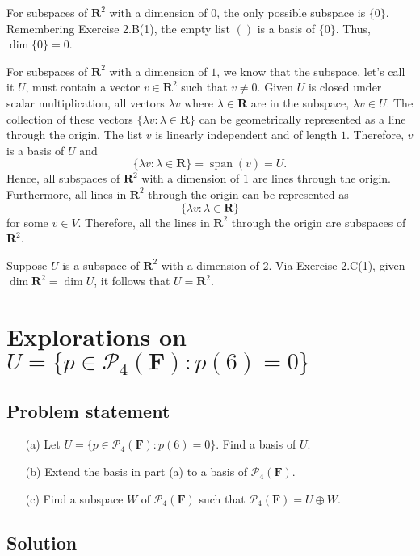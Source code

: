 \documentclass{article}
\begin{document}
For subspaces of $\mathbf{R}^2$ with a dimension of $0$, the only possible subspace is $\{0\}$. 
Remembering Exercise 2.B(1), the empty list $()$ is a basis of $\{0\}$. 
Thus, $\operatorname{dim}\{0\}=0$.

For subspaces of $\mathbf{R}^2$ with a dimension of $1$, we know that the subspace, let's call it $U$, must contain a vector $v\in\mathbf{R}^2$ such that $v\neq0$. 
Given $U$ is closed under scalar multiplication, all vectors $\lambda v$ where $\lambda\in\mathbf{R}$ are in the subspace, $\lambda v\in U$. 
The collection of these vectors $\{\lambda v:\lambda\in\mathbf{R}\}$ can be geometrically represented as a line through the origin. 
The list $v$ is linearly independent and of length $1$. 
Therefore, $v$ is a basis of $U$ and
\[\{\lambda v:\lambda\in\mathbf{R}\}=\operatorname{span}(v)=U.\]
Hence, all subspaces of $\mathbf{R}^2$ with a dimension of $1$ are lines through the origin. 
Furthermore, all lines in $\mathbf{R}^2$ through the origin can be represented as 
\[\{\lambda v:\lambda\in\mathbf{R}\}\]
for some $v\in V$. 
Therefore, all the lines in $\mathbf{R}^2$ through the origin are subspaces of $\mathbf{R}^2$.

Suppose $U$ is a subspace of $\mathbf{R}^2$ with a dimension of $2$. 
Via Exercise 2.C(1), given $\operatorname{dim}\mathbf{R}^2=\operatorname{dim}U$, it follows that $U=\mathbf{R}^2$.

\clearpage

\renewcommand{\thesection}{4}
\section{Explorations on $U=\{p\in\mathcal{P}_4(\mathbf{F}):p(6)=0\}$}
\subsection*{Problem statement}
\begin{enumerate}
    \item[(a)] Let $U=\{p\in\mathcal{P}_4(\mathbf{F}):p(6)=0\}$. Find a basis of $U$.
    \item[(b)] Extend the basis in part (a) to a basis of $\mathcal{P}_4(\mathbf{F})$.
    \item[(c)] Find a subspace $W$ of $\mathcal{P}_4(\mathbf{F})$ such that $\mathcal{P}_4(\mathbf{F})=U\oplus W$.
\end{enumerate}

\subsection*{Solution}
\end{document}
